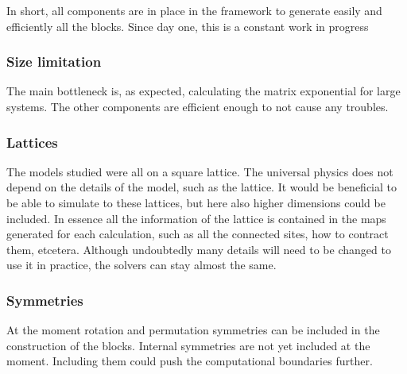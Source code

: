 
In short, all components are in place in the framework to generate easily and efficiently all the blocks. Since day one, this is a constant work in progress

\subsubsection{Size limitation}
The main bottleneck is, as expected, calculating the matrix exponential for large systems. The other components are efficient enough to not cause any troubles.

\subsubsection{Lattices}
The models studied were all on a square lattice. The universal physics does not depend on the details of the model, such as the lattice. It would be beneficial to be able to simulate to these lattices, but here also higher dimensions could be included. In essence all the information of the lattice is contained in the maps generated for each calculation, such as all the connected sites, how to contract them, etcetera. Although undoubtedly many details will need to be changed to use it in practice, the solvers can stay almost the same.

\subsubsection{Symmetries}

At the moment rotation and permutation symmetries can be included in the construction of the blocks. Internal symmetries are not yet included at the moment. Including them could push the computational boundaries further.


